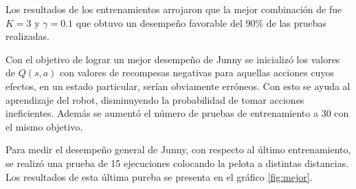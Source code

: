 %
%
%
%

Los resultados de los entrenamientos arrojaron que la mejor combinaci\'on de fue $K = 3$ y $ \gamma = 0.1 $ que obtuvo un desempeño favorable del 90\% de las pruebas realizadas.

Con el objetivo de lograr un mejor desempeño de Junny se inicializ\'o los valores de $Q(s,a)$ con valores de recompesas negativas para aquellas acciones cuyos efectos, en un estado particular, serían obviamente err\'oneos. Con esto se ayuda al aprendizaje del robot, disminuyendo la probabilidad de tomar acciones ineficientes. Adem\'as se aumentó el n\'umero de pruebas de entrenamiento a 30 con el mismo objetivo.

Para medir el desempeño general de Junny, con respecto al último entrenamiento, se realizó una prueba de 15 ejecuciones colocando la pelota a distintas distancias. Los resultados de esta \'ultima pureba se presenta en el gr\'afico \ref{fig:mejor}. 

